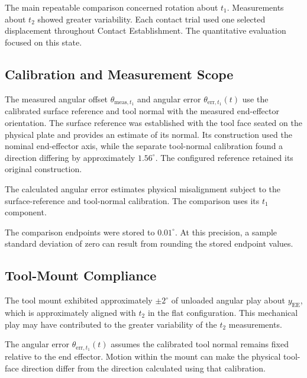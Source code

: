 The main repeatable comparison concerned rotation about \mbox{\(t_1\)}.
Measurements about \mbox{\(t_2\)} showed greater variability.
Each contact trial used one selected  displacement throughout
Contact Establishment. The quantitative evaluation focused on this state.

\subsection{Calibration and Measurement Scope}
\label{subsec:conclusion_measurement_uncertainty}

The measured angular offset \mbox{\(\theta_{\mathrm{meas},t_1}\)} and angular
error \mbox{\(\theta_{\mathrm{err},t_1}(t)\)} use the calibrated surface
reference and tool normal with the measured end-effector orientation.
The surface reference was established with the tool face seated on the
physical plate and provides an estimate of its normal.
Its construction used the nominal end-effector axis, while the separate
tool-normal calibration found a direction differing by approximately
\mbox{\(1.56^\circ\)}.
The configured reference retained its original construction.

The calculated angular error estimates physical
misalignment subject to the surface-reference and tool-normal calibration.
The comparison uses its \mbox{\(t_1\)} component.

The comparison endpoints were stored to \mbox{\(0.01^\circ\)}.
At this precision, a sample standard deviation of zero can result from
rounding the stored endpoint values.

\subsection{Tool-Mount Compliance}
\label{subsec:conclusion_tool_mount}

The tool mount exhibited approximately \mbox{\(\pm2^\circ\)} of unloaded
angular play about \mbox{\(y_{\mathrm{EE}}\)}, which is approximately aligned
with \mbox{\(t_2\)} in the flat configuration. This mechanical play may have
contributed to the greater variability of the \mbox{\(t_2\)} measurements.

\begin{samepage}
The angular error \mbox{\(\theta_{\mathrm{err},t_1}(t)\)} assumes the
calibrated tool normal remains fixed relative to the end effector.
Motion within the mount can make the physical
tool-face direction differ from the direction calculated using that calibration.
\par\end{samepage}

